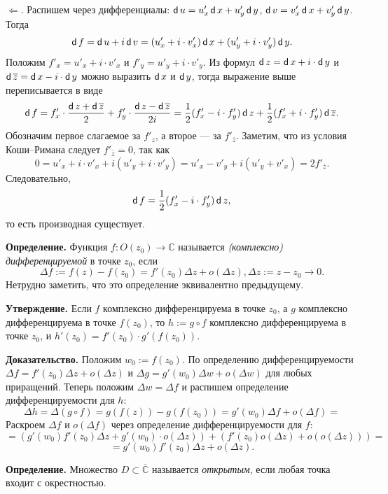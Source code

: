 $\Leftarrow$. Распишем через дифференциалы: $\operatorname{\mathsf d} u = u'_x \operatorname{\mathsf d} x + u'_y \operatorname{\mathsf d} y$, $\operatorname{\mathsf d} v = v'_x \operatorname{\mathsf d} x + v'_y \operatorname{\mathsf d} y$.
Тогда 
\[
    \operatorname{\mathsf d} f = \operatorname{\mathsf d} u + i \operatorname{\mathsf d} v = (u'_x + i \cdot v'_x) \operatorname{\mathsf d} x + (u'_y + i \cdot v'_y) \operatorname{\mathsf d} y.
\]
Положим $f'_x = u'_x + i \cdot v'_x$ и $f'_y = u'_y + i \cdot v'_y$.
Из формул $\operatorname{\mathsf d} z = \operatorname{\mathsf d} x + i \cdot \operatorname{\mathsf d} y$ и $\operatorname{\mathsf d} \overline z = \operatorname{\mathsf d} x - i \cdot \operatorname{\mathsf d} y$ можно выразить $\operatorname{\mathsf d} x$ и $\operatorname{\mathsf d} y$, тогда выражение выше переписывается в виде
\[
    \operatorname{\mathsf d} f = f'_x \cdot \frac{\operatorname{\mathsf d} z + \operatorname{\mathsf d} \overline z}{2} + f'_y \cdot \frac{\operatorname{\mathsf d} z - \operatorname{\mathsf d} \overline z}{2i} = \frac{1}{2} (f'_x - i \cdot f'_y) \operatorname{\mathsf d} z + \frac{1}{2} (f'_x + i \cdot f'_y) \operatorname{\mathsf d} \overline z.
\]
Обозначим первое слагаемое за $f'_z$, а второе --- за $f'_{\overline z}$.
Заметим, что из условия Коши--Римана следует $f'_{\overline z} = 0$, так как
\[
    0  = u'_x + i \cdot v'_x + i(u'_y + i \cdot v'_y) = u'_x - v'_y + i(u'_y + v'_x) = 2f'_{\overline z}.
\]
Следовательно, 
\[
    \operatorname{\mathsf d} f = \frac{1}{2} (f'_x - i \cdot f'_y) \operatorname{\mathsf d} z,
\]
то есть производная существует.

\QED

\textbf{Определение.} Функция $f: O(z_0) \to \mathbb C$ называется \textit{(комплексно) дифференцируемой} в точке $z_0$, если
\[
    \Delta f := f(z) - f(z_0) = f'(z_0) \Delta z + o(\Delta z), \Delta z := z - z_0 \to 0.
\]
Нетрудно заметить, что это определение эквивалентно предыдущему.

\textbf{Утверждение.} Если $f$ комплексно дифференцируема в точке $z_0$, а $g$ комплексно дифференцируема в точке $f(z_0)$, то $h := g \circ f$ комплексно дифференцируема в точке $z_0$, и $h'(z_0) = f'(z_0) \cdot g'(f(z_0))$.

\textbf{Доказательство.} Положим $w_0 := f(z_0)$. 
По определению дифференцируемости $\Delta f = f'(z_0) \Delta z + o(\Delta z)$ и $\Delta g = g'(w_0) \Delta w + o(\Delta w)$ для любых приращений.
Теперь положим $\Delta w = \Delta f$ и распишем определение дифференцируемости для $h$:
\[
    \Delta h = \Delta (g \circ f) = g(f(z)) - g(f(z_0)) = g'(w_0) \Delta f + o(\Delta f) =
\]
Раскроем $\Delta f$ и $o(\Delta f)$ через определение дифференцируемости для $f$:
\[
    = (g'(w_0) f'(z_0) \Delta z + g'(w_0) \cdot o(\Delta z)) + (f'(z_0) o(\Delta z) + o(o(\Delta z))) =
\]
\[
    = g'(w_0) f'(z_0) \Delta z + o(\Delta z).
\]

\QED

\textbf{Определение.} Множество $D \subset \overline {\mathbb C}$ называется \textit{открытым}, если любая точка входит с окрестностью.


